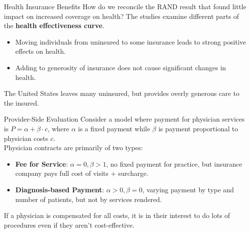 \documentclass[10pt]{extarticle}
\begin{document}
  \begin{problem}{Health Insurance Benefits}
    How do we reconcile the RAND result that found little impact on increased coverage on health? The studies examine different parts of the \textbf{health effectiveness curve}.
    \begin{itemize}
      \item Moving individuals from uninsured to some insurance leads to strong positive effects on health.
      \item Adding to generosity of insurance does not cause significant changes in health.
    \end{itemize}
    The United States leaves many uninsured, but provides overly generous care to the insured.
  \end{problem}
  \begin{problem}{Provider-Side Evaluation}
    Consider a model where payment for physician services is $P = \alpha + \beta \cdot c$, where $\alpha$ is a fixed payment while $\beta$ is payment proportional to physician costs $c$.\\

    Physician contracts are primarily of two types:
    \begin{itemize}
      \item \textbf{Fee for Service}: $\alpha = 0, \beta > 1$, no fixed payment for practice, but insurance company pays full cost of visits + surcharge.
      \item \textbf{Diagnosis-based Payment}: $\alpha > 0, \beta = 0$, varying payment by type and number of patients, but not by services rendered.
    \end{itemize}
    If a physician is compensated for all costs, it is in their interest to do lots of procedures even if they aren't cost-effective.\\


\end{problem}
\end{document}
